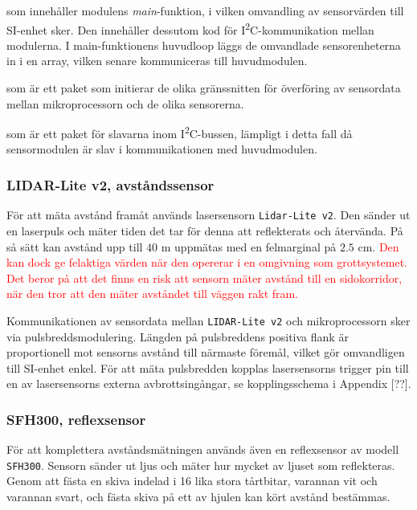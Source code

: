 \documentclass[11pt]{article}
\begin{document}
\begin{flushleft}
\begin{description}[style=unboxed, leftmargin=0cm]
  \item[sensorModule.c] som innehåller modulens \textit{main}-funktion, i vilken omvandling av sensorvärden till SI-enhet sker. Den innehåller dessutom kod för I\textsuperscript{2}C-kommunikation mellan modulerna. I main-funktionens huvudloop läggs de omvandlade sensorenheterna in i en array, vilken senare kommuniceras till huvudmodulen.
  \item[sensorInit.h] som är ett paket som initierar de olika gränssnitten för överföring av sensordata mellan mikroprocessorn och de olika sensorerna.
  \item[I2C\_slave.h] som är ett paket för slavarna inom I\textsuperscript{2}C-bussen, lämpligt i detta fall då sensormodulen är slav i kommunikationen med huvudmodulen.
\end{description}

\subsubsection{LIDAR-Lite v2, avståndssensor}
För att mäta avstånd framåt används lasersensorn \verb+Lidar-Lite v2+. Den sänder ut en laserpuls och mäter tiden det tar för denna att reflekterats och återvända. På så sätt kan avstånd upp till $40$ m uppmätas med en felmarginal på $2.5$ cm.  \textcolor{red}{Den kan dock ge felaktiga värden när den opererar i en omgivning som grottsystemet. Det beror på att det finns en risk att sensorn mäter avstånd till en sidokorridor, när den tror att den mäter avståndet till väggen rakt fram.}

Kommunikationen av sensordata mellan \verb+LIDAR-Lite v2+ och mikroprocessorn sker via pulsbreddsmodulering. Längden på pulsbreddens positiva flank är proportionell mot sensorns avstånd till närmaste föremål, vilket gör omvandligen till SI-enhet enkel. För att mäta pulsbredden kopplas lasersensorns trigger pin till en av lasersensorns externa avbrottsingångar, se kopplingsschema i Appendix [??]. 

\subsubsection{SFH300, reflexsensor}
För att komplettera avståndsmätningen används även en reflexsensor av modell \verb+SFH300+. Sensorn sänder ut ljus och mäter hur mycket av ljuset som reflekteras. Genom att fästa en skiva indelad i 16 lika stora tårtbitar, varannan vit och varannan svart, och fästa skiva på ett av hjulen kan kört avstånd bestämmas.


\end{flushleft}
\end{document}
